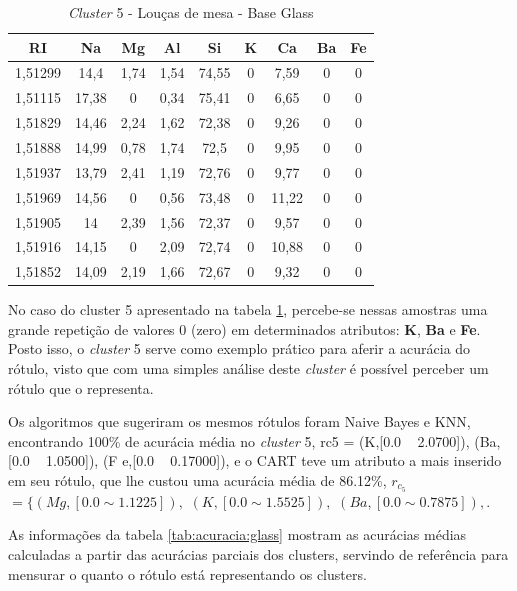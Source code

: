 \begin{table}[!ht]
\centering
\caption{\textit{Cluster} 5 - Louças de mesa - Base Glass }
\label{tab:glass:cluster5}
\begin{tabular}{c|c|c|c|c|c|c|c|c}
\hline
\rowcolor[HTML]{EFEFEF}
\textbf{RI} & \textbf{Na} & \textbf{Mg} & \textbf{Al} & \textbf{Si} & \textbf{K} & \textbf{Ca} & \textbf{Ba} & \textbf{Fe}\\ \hline 
1,51299 & 14,4 & 1,74 & 1,54 & 74,55 & 0 & 7,59 & 0 & 0\\ 
1,51115 & 17,38 & 0 & 0,34 & 75,41 & 0 & 6,65 & 0 & 0\\ 
1,51829 & 14,46 & 2,24 & 1,62 & 72,38 & 0 & 9,26 & 0 & 0\\ 
1,51888 & 14,99 & 0,78 & 1,74 & 72,5 & 0 & 9,95 & 0 & 0\\ 
1,51937 & 13,79 & 2,41 & 1,19 & 72,76 & 0 & 9,77 & 0 & 0\\ 
1,51969 & 14,56 & 0 & 0,56 & 73,48 & 0 & 11,22 & 0 & 0\\ 
1,51905 & 14 & 2,39 & 1,56 & 72,37 & 0 & 9,57 & 0 & 0\\ 
1,51916 & 14,15 & 0 & 2,09 & 72,74 & 0 & 10,88 & 0 & 0\\ 
1,51852 & 14,09 & 2,19 & 1,66 & 72,67 & 0 & 9,32 & 0 & 0\\ 

    
\end{tabular}
\end{table}

No caso do cluster 5 apresentado na tabela \ref{tab:glass:cluster5}, percebe-se nessas amostras uma grande repetição de valores 0 (zero) em determinados atributos:  \textbf{K}, \textbf{Ba} e \textbf{Fe}. Posto isso, o \textit{cluster} 5 serve como exemplo prático para aferir a acurácia do rótulo, visto que com uma simples análise deste \textit{cluster} é possível perceber um rótulo que o representa. 
 

Os algoritmos que sugeriram os mesmos rótulos foram Naive Bayes e KNN, encontrando 100\% de acurácia média no \textit{cluster} 5, rc5 = {(K,[0.0 ~ 2.0700]), (Ba,[0.0 ~ 1.0500]), (F e,[0.0 ~ 0.17000])}, e o CART teve um atributo a mais inserido em seu rótulo, que lhe custou uma acurácia média de 86.12\%, ${r_{c_5}}$ ${=\{ (Mg,[ 0.0 \sim  1.1225 ] ),}$ ${(K,[ 0.0 \sim 1.5525 ]  ),}$ ${(Ba,[ 0.0 \sim 0.7875 ] ), }$.


As informações da tabela \ref{tab:acuracia:glass} mostram as acurácias médias calculadas a partir das acurácias parciais dos clusters, servindo de referência para mensurar o quanto o rótulo está representando os clusters. 

